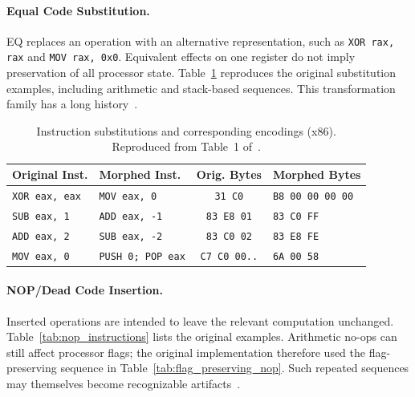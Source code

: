 \documentclass[runningheads]{llncs}
\begin{document}
\paragraph{Equal Code Substitution.}
EQ replaces an operation with an alternative representation, such as
\texttt{XOR rax, rax} and \texttt{MOV rax, 0x0}. Equivalent effects on one
register do not imply preservation of all processor state.
Table~\ref{tab:instruction_substitutions_x86} reproduces the original
substitution examples, including arithmetic and stack-based sequences.
This transformation family has a long
history~\cite{desai2008towards,desai2010highly,szor2001hunting}.

\begin{table}[t]
    \caption{Instruction substitutions and corresponding encodings (x86). Reproduced from Table~1 of~\cite{zone_secrypt_2026}.}
    \label{tab:instruction_substitutions_x86}
    \small
    \centering
    \setlength{\tabcolsep}{3pt}
    \begin{tabular}{llcl}
        \hline
        \textbf{Original Inst.} & \textbf{Morphed Inst.} & \textbf{Orig. Bytes} & \textbf{Morphed Bytes} \\ \hline
        \texttt{XOR eax, eax} & \texttt{MOV eax, 0} & \texttt{31 C0} & \texttt{B8 00 00 00 00} \\
        \texttt{SUB eax, 1} & \texttt{ADD eax, -1} & \texttt{83 E8 01} & \texttt{83 C0 FF} \\
        \texttt{ADD eax, 2} & \texttt{SUB eax, -2} & \texttt{83 C0 02} & \texttt{83 E8 FE} \\
        \texttt{MOV eax, 0} & \texttt{PUSH 0; POP eax} & \texttt{C7 C0 00..} & \texttt{6A 00 58} \\ \hline
    \end{tabular}
\end{table}

\paragraph{NOP/Dead Code Insertion.}
Inserted operations are intended to leave the relevant computation
unchanged. Table~\ref{tab:nop_instructions} lists the original examples.
Arithmetic no-ops can still affect processor flags; the original
implementation therefore used the flag-preserving sequence in
Table~\ref{tab:flag_preserving_nop}. Such repeated sequences may themselves
become recognizable artifacts~\cite{pushfmeth}.
\end{document}
